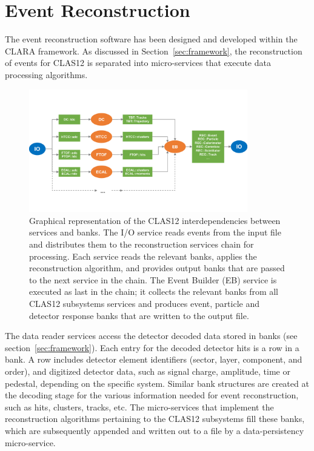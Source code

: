 \section{Event Reconstruction}
\label{sec:recon}

The event reconstruction software has been designed and developed within the CLARA framework. As discussed
in Section~\ref{sec:framework}, the reconstruction of events for CLAS12 is separated into micro-services that
execute data processing algorithms.

\begin{figure}
\centering
\includegraphics[width=0.85\textwidth]{pics/ServiceComposition.pdf}
\caption{Graphical representation of the CLAS12 interdependencies between services and banks. 
The I/O service reads events from the input file and distributes them to the reconstruction services chain for processing. 
Each service reads the relevant banks, applies the reconstruction algorithm, and provides output banks that are passed to 
the next service in the chain. The Event Builder (EB) service is executed as last in the chain; it collects the relevant 
banks from all CLAS12 subsystems services and produces event, particle and detector response banks that are written to the output file.}
\label{fig:services}
\end{figure}

The data reader services access the detector decoded data stored in banks (see section~\ref{sec:framework}).
Each entry for the decoded detector hits is a row in a bank. A row includes detector element identifiers (sector,
layer, component, and order), and digitized detector data, such as signal charge, amplitude, time or pedestal,
depending on the specific system. Similar bank structures are created at the decoding stage for the various
information needed for event reconstruction, such as hits, clusters, tracks, etc. The micro-services that
implement the reconstruction algorithms pertaining to the CLAS12 subsystems fill these banks, which are
subsequently appended and written out to a file by a data-persistency micro-service.

